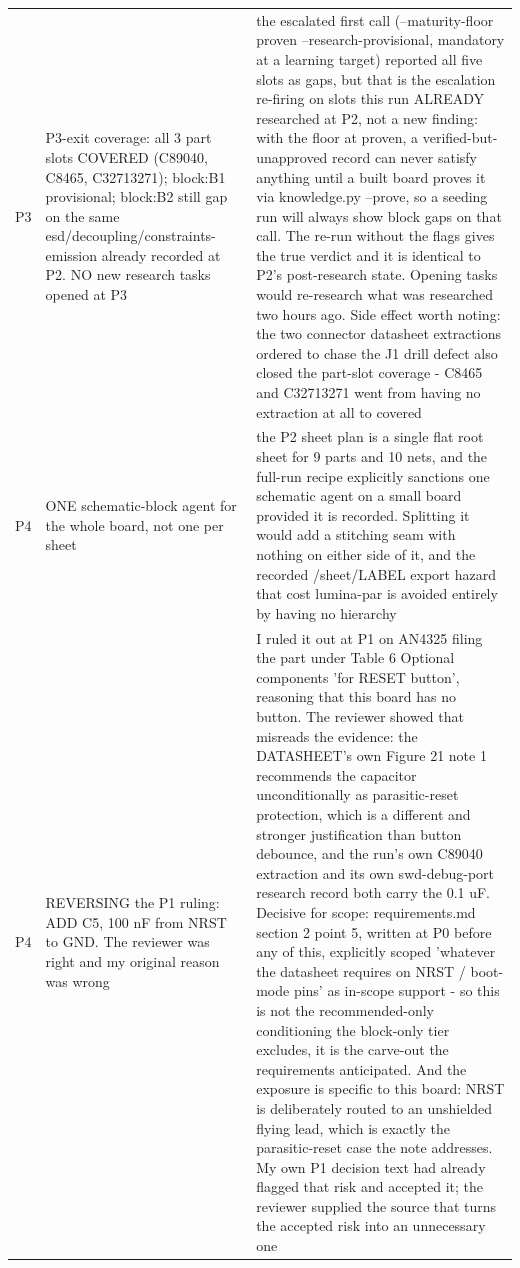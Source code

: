 \documentclass[11pt,a4paper]{article}
\begin{document}
{\begin{longtable}{lp{5.2cm}p{7.2cm}}
P3 & P3-exit coverage: all 3 part slots COVERED (C89040, C8465, C32713271); block:B1 provisional; block:B2 still gap on the same esd/decoupling/constraints-emission already recorded at P2. NO new research tasks opened at P3 & the escalated first call (--maturity-floor proven --research-provisional, mandatory at a learning target) reported all five slots as gaps, but that is the escalation re-firing on slots this run ALREADY researched at P2, not a new finding: with the floor at proven, a verified-but-unapproved record can never satisfy anything until a built board proves it via knowledge.py --prove, so a seeding run will always show block gaps on that call. The re-run without the flags gives the true verdict and it is identical to P2's post-research state. Opening tasks would re-research what was researched two hours ago. Side effect worth noting: the two connector datasheet extractions ordered to chase the J1 drill defect also closed the part-slot coverage - C8465 and C32713271 went from having no extraction at all to covered \\
P4 & ONE schematic-block agent for the whole board, not one per sheet & the P2 sheet plan is a single flat root sheet for 9 parts and 10 nets, and the full-run recipe explicitly sanctions one schematic agent on a small board provided it is recorded. Splitting it would add a stitching seam with nothing on either side of it, and the recorded /sheet/LABEL export hazard that cost lumina-par is avoided entirely by having no hierarchy \\
P4 & REVERSING the P1 ruling: ADD C5, 100 nF from NRST to GND. The reviewer was right and my original reason was wrong & I ruled it out at P1 on AN4325 filing the part under Table 6 Optional components 'for RESET button', reasoning that this board has no button. The reviewer showed that misreads the evidence: the DATASHEET's own Figure 21 note 1 recommends the capacitor unconditionally as parasitic-reset protection, which is a different and stronger justification than button debounce, and the run's own C89040 extraction and its own swd-debug-port research record both carry the 0.1 uF. Decisive for scope: requirements.md section 2 point 5, written at P0 before any of this, explicitly scoped 'whatever the datasheet requires on NRST / boot-mode pins' as in-scope support - so this is not the recommended-only conditioning the block-only tier excludes, it is the carve-out the requirements anticipated. And the exposure is specific to this board: NRST is deliberately routed to an unshielded flying lead, which is exactly the parasitic-reset case the note addresses. My own P1 decision text had already flagged that risk and accepted it; the reviewer supplied the source that turns the accepted risk into an unnecessary one \\

\end{longtable}}
\end{document}
